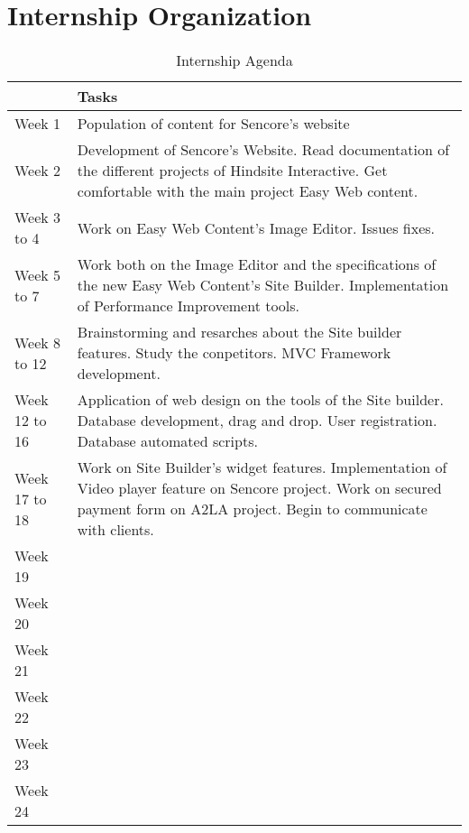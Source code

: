 \chapter{Internship Organization}

\begin{table}[!ht]
	\caption{\label{tableau:agenda}Internship Agenda}
	\begin{tabular}{ | l | p{12cm} | }
		\hline
		 & Tasks\\
		\hline
		Week 1	&	Population of content for Sencore's website\\	\hline
		Week 2	&	Development of Sencore's Website. Read documentation of the different projects of Hindsite Interactive. Get comfortable with the main project Easy Web content.\\	\hline
		Week 3 to 4	&	Work on Easy Web Content's Image Editor. Issues fixes.\\	\hline
		Week 5 to 7	&	Work both on the Image Editor and the specifications of the new Easy Web Content's Site Builder. Implementation of Performance Improvement tools.\\	\hline
		Week 8 to 12	&	Brainstorming and resarches about the Site builder features. Study the conpetitors. MVC Framework development.\\	\hline
		Week 12 to 16	&	Application of web design on the tools of the Site builder. Database development, drag and drop. User registration. Database automated scripts.	\\	\hline
		Week 17	to 18&	Work on Site Builder's widget features. Implementation of Video player feature on Sencore project. Work on secured payment form on A2LA project. Begin to communicate with clients.\\	\hline
		Week 19	&	\\	\hline
		Week 20	&	\\	\hline
		Week 21	&	\\	\hline
		Week 22	&	\\	\hline
		Week 23	&	\\	\hline
		Week 24	&	\\	\hline
	\end{tabular}
\end{table}